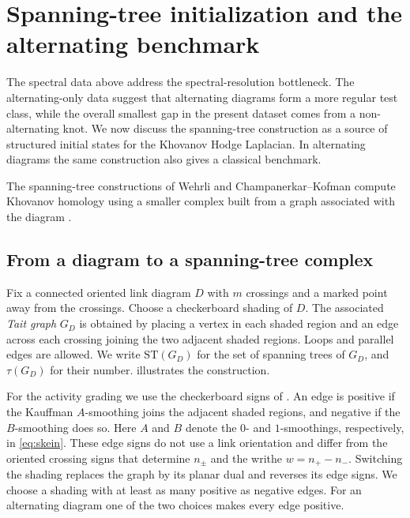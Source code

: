 \documentclass[a4paper,onecolumn,unpublished]{quantumarticle}
\theoremstyle{plain}
\theoremstyle{definition}
\theoremstyle{definition}
\numberwithin{equation}{section}
\begin{document}
\section{Spanning-tree initialization and the alternating benchmark}
\label{sec:spanning_trees}

The spectral data above address the spectral-resolution bottleneck. The alternating-only data suggest that alternating diagrams form a more regular test class, while the overall smallest gap in the present dataset comes from a non-alternating knot. We now discuss the spanning-tree construction as a source of structured initial states for the Khovanov Hodge Laplacian. In alternating diagrams the same construction also gives a classical benchmark.

The spanning-tree constructions of Wehrli and Champanerkar--Kofman compute Khovanov homology using a smaller complex built from a graph associated with the diagram \cite{wehrli2004spanningtree,champanerkar2008spanningtrees,ChampanerkarKofmanMutation2008}.

\subsection{From a diagram to a spanning-tree complex}

Fix a connected oriented link diagram \(D\) with \(m\) crossings and a marked point away from the crossings. Choose a checkerboard shading of \(D\). The associated \emph{Tait graph} \(G_D\) is obtained by placing a vertex in each shaded region and an edge across each crossing joining the two adjacent shaded regions. Loops and parallel edges are allowed. We write \(\mathrm{ST}(G_D)\) for the set of spanning trees of \(G_D\), and \(\tau(G_D)\) for their number.  illustrates the construction.

For the activity grading we use the checkerboard signs of \cite{champanerkar2008spanningtrees}. An edge is positive if the Kauffman \(A\)-smoothing joins the adjacent shaded regions, and negative if the \(B\)-smoothing does so. Here \(A\) and \(B\) denote the \(0\)- and \(1\)-smoothings, respectively, in \cref{eq:skein}. These edge signs do not use a link orientation and differ from the oriented crossing signs that determine \(n_\pm\) and the writhe \(w=n_+-n_-\). Switching the shading replaces the graph by its planar dual and reverses its edge signs. We choose a shading with at least as many positive as negative edges. For an alternating diagram one of the two choices makes every edge positive.
\end{document}
